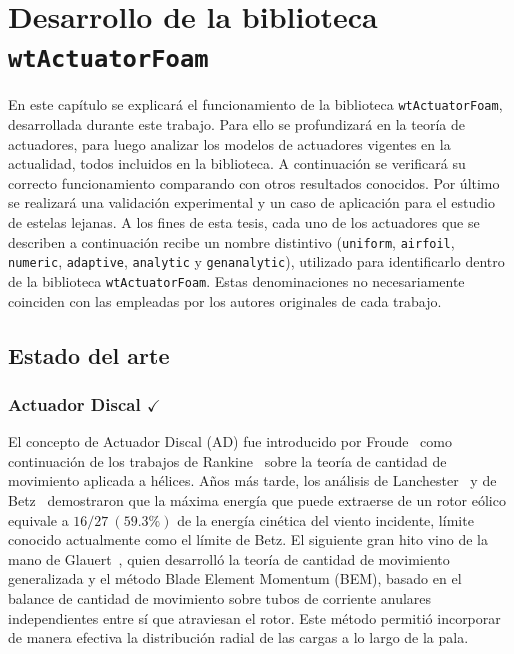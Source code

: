 \chapter{Desarrollo de la biblioteca \texttt{wtActuatorFoam}}
\label{chapter:3}


En este capítulo se explicará el funcionamiento de la biblioteca  \texttt{wtActuatorFoam}, desarrollada durante este trabajo. Para ello se profundizará en la teoría de actuadores, para luego analizar los modelos de actuadores vigentes en la actualidad, todos incluidos en la biblioteca. A continuación se verificará su correcto funcionamiento comparando con otros resultados conocidos. Por último se realizará una validación experimental y un caso de aplicación para el estudio de estelas lejanas. A los fines de esta tesis, cada uno de los actuadores que se describen a continuación recibe un nombre distintivo (\texttt{uniform}, \texttt{airfoil}, \texttt{numeric}, \texttt{adaptive}, \texttt{analytic} y \texttt{genanalytic}), utilizado para identificarlo dentro de la biblioteca \texttt{wtActuatorFoam}. Estas denominaciones no necesariamente coinciden con las empleadas por los autores originales de cada trabajo.

\section{Estado del arte}

\subsection{Actuador Discal $\checkmark$}

El concepto de Actuador Discal (AD) fue introducido por Froude~\cite{froude1889} como continuación de los trabajos de Rankine~\cite{rankine1865} sobre la teoría de cantidad de movimiento aplicada a hélices. Años más tarde, los análisis de Lanchester~\cite{lanchester1915} y de Betz~\cite{betz1920} demostraron que la máxima energía que puede extraerse de un rotor eólico equivale a $16/27\ (59.3\%)$ de la energía cinética del viento incidente, límite conocido actualmente como el límite de Betz. El siguiente gran hito vino de la mano de Glauert~\cite{glauert1935}, quien desarrolló la teoría de cantidad de movimiento generalizada y el método Blade Element Momentum (BEM), basado en el balance de cantidad de movimiento sobre tubos de corriente anulares independientes entre sí que atraviesan el rotor. Este método permitió incorporar de manera efectiva la distribución radial de las cargas a lo largo de la pala.

